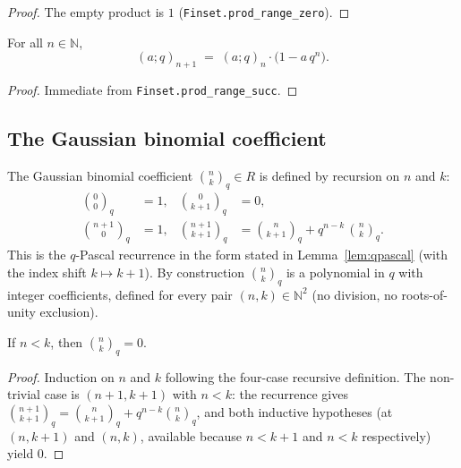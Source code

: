 \begin{proof}\leanok
The empty product is $1$ (\texttt{Finset.prod\_range\_zero}).
\end{proof}

\begin{lemma}[Recurrence]\label{lem:qPochhammer-succ}\leanok{}
For all $n \in \mathbb{N}$,
\[
  (a; q)_{n+1} \;=\; (a; q)_n \cdot \bigl(1 - a\, q^n\bigr).
\]
\end{lemma}

\begin{proof}\leanok
Immediate from \texttt{Finset.prod\_range\_succ}.
\end{proof}

\subsection{The Gaussian binomial coefficient}

\begin{definition}\label{def:qBinom}\leanok
The Gaussian binomial coefficient $\binom{n}{k}_q \in R$ is defined by
recursion on $n$ and $k$:
\[
\begin{aligned}
  \binom{0}{0}_q &= 1,
  & \binom{0}{k+1}_q &= 0, \\
  \binom{n+1}{0}_q &= 1,
  & \binom{n+1}{k+1}_q &= \binom{n}{k+1}_q + q^{n-k}\,\binom{n}{k}_q.
\end{aligned}
\]
This is the $q$-Pascal recurrence in the form stated in
Lemma~\ref{lem:qpascal} (with the index shift $k \mapsto k+1$). By
construction $\binom{n}{k}_q$ is a polynomial in $q$ with integer
coefficients, defined for every pair $(n, k) \in \mathbb{N}^2$ (no
division, no roots-of-unity exclusion).
\end{definition}

\begin{lemma}\label{lem:qBinom-eq-zero-of-lt}\leanok{}
If $n < k$, then $\binom{n}{k}_q = 0$.
\end{lemma}

\begin{proof}\leanok
Induction on $n$ and $k$ following the four-case recursive definition.
The non-trivial case is $(n+1, k+1)$ with $n < k$: the recurrence gives
$\binom{n+1}{k+1}_q = \binom{n}{k+1}_q + q^{n-k}\binom{n}{k}_q$, and both
inductive hypotheses (at $(n, k+1)$ and $(n, k)$, available because
$n < k + 1$ and $n < k$ respectively) yield $0$.
\end{proof}

